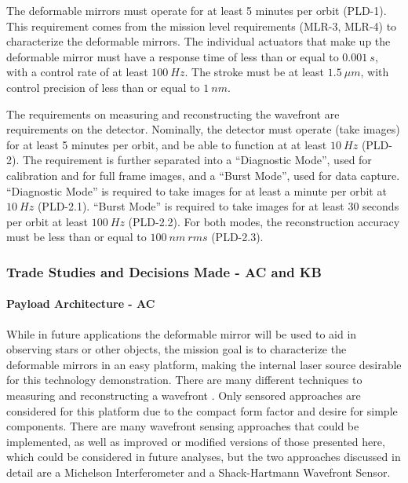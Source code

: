 \documentclass[12pt]{article}
\begin{document}
The deformable mirrors must operate for at least 5 minutes per orbit (PLD-1).  This requirement comes from the mission level requirements (MLR-3, MLR-4) to characterize the deformable mirrors.  The individual actuators that make up the deformable mirror must have a response time of less than or equal to $0.001\ s$, with a control rate of at least $100\ Hz$.  The stroke must be at least $1.5\ \mu m$, with control precision of less than or equal to $1\ nm$.

The requirements on measuring and reconstructing the wavefront are requirements on the detector.  Nominally, the detector must operate (take images) for at least 5 minutes per orbit, and be able to function at at least $10\ Hz$ (PLD-2). The requirement is further separated into a “Diagnostic Mode”, used for calibration and for full frame images, and a “Burst Mode”, used for data capture.  “Diagnostic Mode” is required to take images for at least a minute per orbit at $10\ Hz$ (PLD-2.1).  “Burst Mode” is required to take images for at least 30 seconds per orbit at least $100\ Hz$ (PLD-2.2).  For both modes, the reconstruction accuracy must be less than or equal to $100\ nm\ rms$ (PLD-2.3).

			\subsubsection{Trade Studies and Decisions Made - AC and KB}

\paragraph{Payload Architecture - AC}

While in future applications the deformable mirror will be used to aid in observing stars or other objects, the mission goal is to characterize the deformable mirrors in an easy platform, making the internal laser source desirable for this technology demonstration. There are many different techniques to measuring and reconstructing a wavefront \cite{FGadaptiveoptics}. Only sensored approaches are considered for this platform due to the compact form factor and desire for simple components. There are many wavefront sensing approaches that could be implemented, as well as improved or modified versions of those presented here, which could be considered in future analyses, but the two approaches discussed in detail are a Michelson Interferometer and a Shack-Hartmann Wavefront Sensor.
\end{document}
